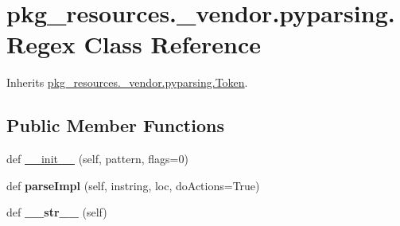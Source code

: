 \hypertarget{classpkg__resources_1_1__vendor_1_1pyparsing_1_1_regex}{}\section{pkg\+\_\+resources.\+\_\+vendor.\+pyparsing.\+Regex Class Reference}
\label{classpkg__resources_1_1__vendor_1_1pyparsing_1_1_regex}


Inherits \hyperlink{classpkg__resources_1_1__vendor_1_1pyparsing_1_1_token}{pkg\+\_\+resources.\+\_\+vendor.\+pyparsing.\+Token}.

\subsection*{Public Member Functions}
\begin{DoxyCompactItemize}
\item 
def \hyperlink{classpkg__resources_1_1__vendor_1_1pyparsing_1_1_regex_a344d143fdcdc1ff4aef98404422781f1}{\+\_\+\+\_\+init\+\_\+\+\_\+} (self, pattern, flags=0)
\item 
\mbox{\label{classpkg__resources_1_1__vendor_1_1pyparsing_1_1_regex_af18815c256629aaf99e23f3cbf1bb90c}} 
def {\bfseries parse\+Impl} (self, instring, loc, do\+Actions=True)
\item 
\mbox{\label{classpkg__resources_1_1__vendor_1_1pyparsing_1_1_regex_aaccca833661bfd93cd288838783438f6}} 
def {\bfseries \+\_\+\+\_\+str\+\_\+\+\_\+} (self)
\end{DoxyCompactItemize}
